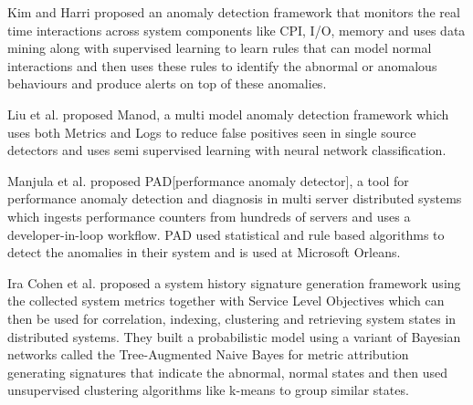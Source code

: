 \documentclass[sigconf]{acmart}
\begin{document}
Kim and Harri proposed an anomaly detection framework that monitors the real time interactions across system components like CPI, I/O, memory and uses data mining along with supervised learning to learn rules that can model normal interactions and then uses these rules to identify the abnormal or anomalous behaviours and produce alerts on top of these anomalies.\cite{4297016}

Liu et al. proposed Manod, a multi model anomaly detection framework which uses both Metrics and Logs to reduce false positives seen in single source detectors and uses semi supervised learning with neural network classification.\cite{LIU2026107999}

Manjula et al. proposed PAD[performance anomaly detector], a tool for performance anomaly detection and diagnosis in multi server distributed systems which ingests performance counters from hundreds of servers and uses a developer-in-loop workflow. PAD used statistical and rule based algorithms to detect the anomalies in their system and is used at Microsoft Orleans.\cite{6973813}

Ira Cohen et al. proposed a system history signature generation framework using the collected system metrics together with Service Level Objectives which can then be used for correlation, indexing, clustering and retrieving system states in distributed systems. They built a probabilistic model using a variant of Bayesian networks called the Tree-Augmented Naive Bayes for metric attribution generating signatures that indicate the abnormal, normal states and then used unsupervised clustering algorithms like k-means to group similar states.\cite{10.1145/1095810.1095821}
\end{document}
